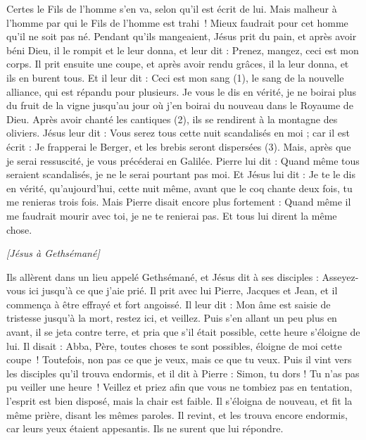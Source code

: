 \begin{multicols}{2}
Certes le Fils de l'homme s'en va, selon qu'il est écrit de lui. Mais malheur à l'homme par qui le Fils de l'homme est trahi ! Mieux faudrait pour cet homme qu’il ne soit pas né.
Pendant qu’ils mangeaient, Jésus prit du pain, et après avoir béni Dieu, il le rompit et le leur donna, et leur dit : Prenez, mangez, ceci est mon corps.
Il prit ensuite une coupe, et après avoir rendu grâces, il la leur donna, et ils en burent tous.
Et il leur dit : Ceci est mon sang (1), le sang de la nouvelle alliance, qui est répandu pour plusieurs.
Je vous le dis en vérité, je ne boirai plus du fruit de la vigne jusqu'au jour où j’en boirai du nouveau dans le Royaume de Dieu.
Après avoir chanté les cantiques (2), ils se rendirent à la montagne des oliviers.
Jésus leur dit : Vous serez tous cette nuit scandalisés en moi ; car il est écrit : Je frapperai le Berger, et les brebis seront dispersées (3).
Mais, après que je serai ressuscité, je vous précéderai en Galilée.
Pierre lui dit : Quand même tous seraient scandalisés, je ne le serai pourtant pas moi.
Et Jésus lui dit : Je te le dis en vérité, qu'aujourd'hui, cette nuit même, avant que le coq chante deux fois, tu me renieras trois fois.
Mais Pierre disait encore plus fortement : Quand même il me faudrait mourir avec toi, je ne te renierai pas. Et tous lui dirent la même chose.
\begin{center}
\textit{[Jésus à Gethsémané]}
\end{center}
\PPE{}
Ils allèrent dans un lieu appelé Gethsémané, et Jésus dit à ses disciples : Asseyez-vous ici jusqu'à ce que j’aie prié.
Il prit avec lui Pierre, Jacques et Jean, et il commença à être effrayé et fort angoissé.
Il leur dit : Mon âme est saisie de tristesse jusqu’à la mort, restez ici, et veillez.
Puis s'en allant un peu plus en avant, il se jeta contre terre, et pria que s'il était possible, cette heure s’éloigne de lui.
Il disait : Abba, Père, toutes choses te sont possibles, éloigne de moi cette coupe ! Toutefois, non pas ce que je veux, mais ce que tu veux.
Puis il vint vers les disciples qu’il trouva endormis, et il dit à Pierre : Simon, tu dors ! Tu n’as pas pu veiller une heure !
Veillez et priez afin que vous ne tombiez pas en tentation, l'esprit est bien disposé, mais la chair est faible.
Il s’éloigna de nouveau, et fit la même prière, disant les mêmes paroles.
Il revint, et les trouva encore endormis, car leurs yeux étaient appesantis. Ils ne surent que lui répondre.

\end{multicols}
